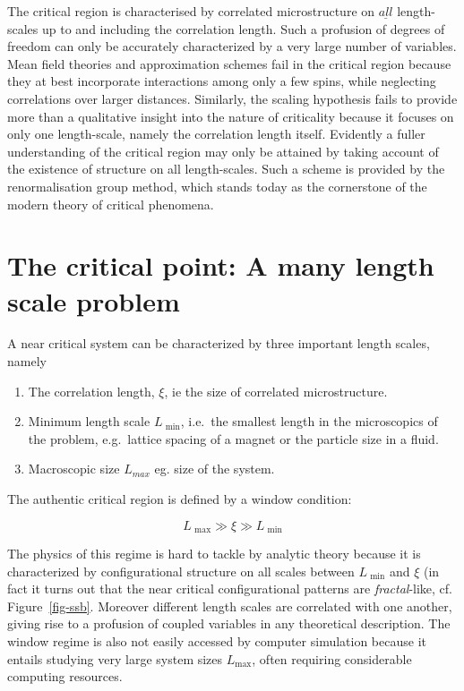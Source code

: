 \documentclass[
  letterpaper,
  enabledeprecatedfontcommands]{report}
\begin{document}
The critical region is characterised by correlated microstructure on
\(\underline{all}\) length-scales up to and including the correlation
length. Such a profusion of degrees of freedom can only be accurately
characterized by a very large number of variables. Mean field theories
and approximation schemes fail in the critical region because they at
best incorporate interactions among only a few spins, while neglecting
correlations over larger distances. Similarly, the scaling hypothesis
fails to provide more than a qualitative insight into the nature of
criticality because it focuses on only one length-scale, namely the
correlation length itself. Evidently a fuller understanding of the
critical region may only be attained by taking account of the existence
of structure on all length-scales. Such a scheme is provided by the
renormalisation group method, which stands today as the cornerstone of
the modern theory of critical phenomena.

\section{The critical point: A many length scale
problem}\label{the-critical-point-a-many-length-scale-problem}

A near critical system can be characterized by three important length
scales, namely

\begin{enumerate}
\def\labelenumi{\arabic{enumi}.}
\item
  The correlation length, \(\xi\), ie the size of correlated
  microstructure.
\item
  Minimum length scale \(L_\textrm{ min}\), i.e.~the smallest length in
  the microscopics of the problem, e.g.~lattice spacing of a magnet or
  the particle size in a fluid.
\item
  Macroscopic size \(L_{max}\) eg. size of the system.
\end{enumerate}

The authentic critical region is defined by a window condition:

\[L_\textrm{ max} \gg \xi \gg L_\textrm{ min}\]

The physics of this regime is hard to tackle by analytic theory because
it is characterized by configurational structure on all scales between
\(L_\textrm{ min}\) and \(\xi\) (in fact it turns out that the near
critical configurational patterns are \emph{fractal}-like, cf.
Figure~\ref{fig-ssb}. Moreover different length scales are correlated
with one another, giving rise to a profusion of coupled variables in any
theoretical description. The window regime is also not easily accessed
by computer simulation because it entails studying very large system
sizes \(L_\textrm{
max}\), often requiring considerable computing resources.
\end{document}
